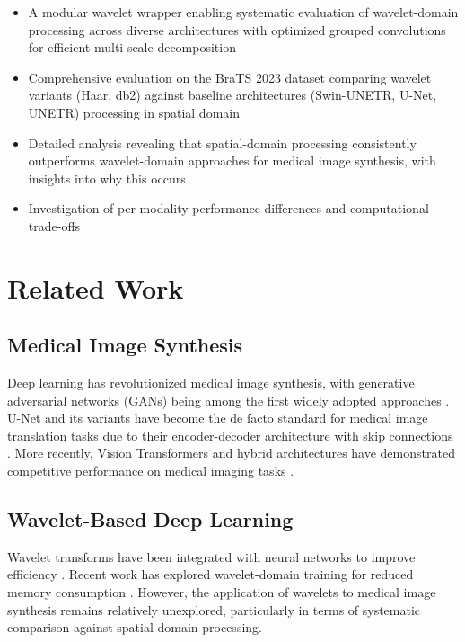 \documentclass[conference]{IEEEtran}
\begin{document}
\begin{itemize}
    \item A modular wavelet wrapper enabling systematic evaluation of wavelet-domain processing across diverse architectures with optimized grouped convolutions for efficient multi-scale decomposition
    \item Comprehensive evaluation on the BraTS 2023 dataset comparing wavelet variants (Haar, db2) against baseline architectures (Swin-UNETR, U-Net, UNETR) processing in spatial domain
    \item Detailed analysis revealing that spatial-domain processing consistently outperforms wavelet-domain approaches for medical image synthesis, with insights into why this occurs
    \item Investigation of per-modality performance differences and computational trade-offs
\end{itemize}

\section{Related Work}

\subsection{Medical Image Synthesis}

Deep learning has revolutionized medical image synthesis, with generative adversarial networks (GANs) being among the first widely adopted approaches \cite{goodfellow2014generative}. U-Net and its variants have become the de facto standard for medical image translation tasks due to their encoder-decoder architecture with skip connections \cite{ronneberger2015unet}. More recently, Vision Transformers and hybrid architectures have demonstrated competitive performance on medical imaging tasks \cite{chen2024transunet}.

\subsection{Wavelet-Based Deep Learning}

Wavelet transforms have been integrated with neural networks to improve efficiency \cite{williams2018wavelet}. Recent work has explored wavelet-domain training for reduced memory consumption \cite{cotter2018deep}. However, the application of wavelets to medical image synthesis remains relatively unexplored, particularly in terms of systematic comparison against spatial-domain processing.
\end{document}
